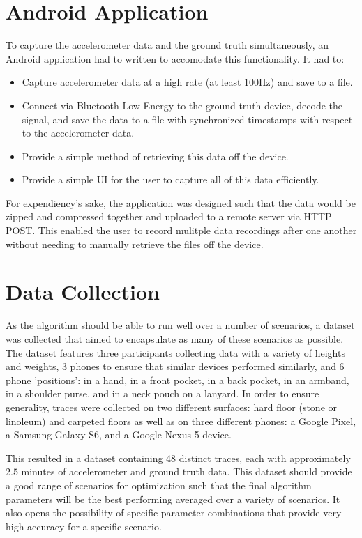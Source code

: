         \section{Android Application}

            To capture the accelerometer data and the ground truth simultaneously, an Android application had to written to accomodate this functionality. It had to:

            \begin{itemize}
                \item Capture accelerometer data at a high rate (at least 100Hz) and save to a file.
                \item Connect via Bluetooth Low Energy to the ground truth device, decode the signal, and save the data to a file with synchronized timestamps with respect to the accelerometer data.
                \item Provide a simple method of retrieving this data off the device.
                \item Provide a simple UI for the user to capture all of this data efficiently.
            \end{itemize}

            For expendiency's sake, the application was designed such that the data would be zipped and compressed together and uploaded to a remote server via HTTP POST. This enabled the user to record mulitple data recordings after one another without needing to manually retrieve the files off the device.


        \section{Data Collection}

            As the algorithm should be able to run well over a number of scenarios, a dataset was collected that aimed to encapsulate as many of these scenarios as possible. The dataset features three participants collecting data with a variety of heights and weights, 3 phones to ensure that similar devices performed similarly, and 6 phone 'positions': in a hand, in a front pocket, in a back pocket, in an armband, in a shoulder purse, and in a neck pouch on a lanyard. In order to ensure generality, traces were collected on two different surfaces: hard floor (stone or linoleum) and carpeted floors as well as on three different phones: a Google Pixel, a Samsung Galaxy S6, and a Google Nexus 5 device.

            This resulted in a dataset containing 48 distinct traces, each with approximately $2.5$ minutes of accelerometer and ground truth data. This dataset should provide a good range of scenarios for optimization such that the final algorithm parameters will be the best performing averaged over a variety of scenarios. It also opens the possibility of specific parameter combinations that provide very high accuracy for a specific scenario. 

